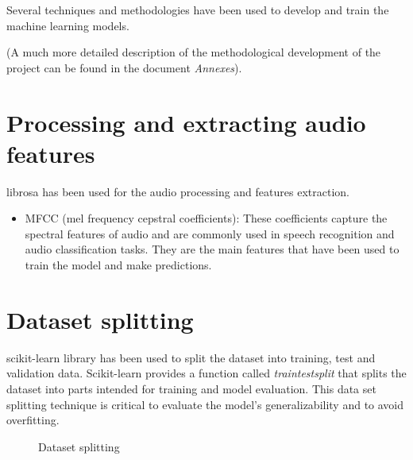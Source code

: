 Several techniques and methodologies have been used to develop and train the machine learning models.

(A much more detailed description of the methodological development of the project can be found in the document \textit{Annexes}).

\section{Processing and extracting audio features}

librosa has been used for the audio processing and features extraction.

\begin{itemize}
\item MFCC (mel frequency cepstral coefficients): These coefficients capture the spectral features of audio and are commonly used in speech recognition and audio classification tasks. They are the main features that have been used to train the model and make predictions.
\end{itemize}

\section{Dataset splitting}

scikit-learn library has been used to split the dataset into training, test and validation data.
Scikit-learn provides a function called \textit{train\textunderscore test\textunderscore split} that splits the dataset into parts intended for training and model evaluation. 
This data set splitting technique is critical to evaluate the model's generalizability and to avoid overfitting.

\begin{figure}
  \centering
  \caption{Dataset splitting}
\end{figure}

